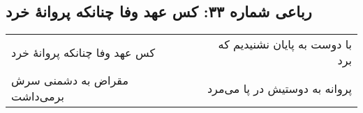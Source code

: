 \begin{center}
\section*{رباعی شماره ۳۳: کس عهد وفا چنانکه پروانهٔ خرد}
\label{sec:033}
\begin{longtable}{l p{0.5cm} r}
کس عهد وفا چنانکه پروانهٔ خرد
&&
با دوست به پایان نشنیدیم که برد
\\
مقراض به دشمنی سرش برمی‌داشت
&&
پروانه به دوستیش در پا می‌مرد
\\
\end{longtable}
\end{center}
